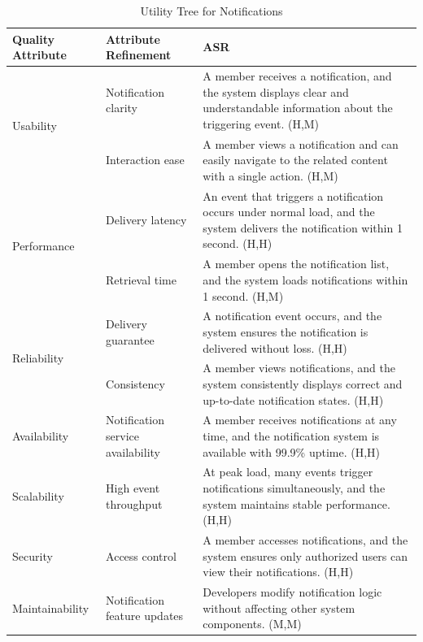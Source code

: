 \documentclass{article}
\begin{document}
\begin{table}[H]
\centering
\caption{Utility Tree for Notifications}
\begin{tabular}{|p{3cm}|p{4cm}|p{7cm}|}
\hline
\textbf{Quality Attribute} & \textbf{Attribute Refinement} & \textbf{ASR} \\
\hline

\multirow{2}{*}{Usability}
& Notification clarity
& A member receives a notification, and the system displays clear and understandable information about the triggering event. (H,M) \\
\cline{2-3}
& Interaction ease
& A member views a notification and can easily navigate to the related content with a single action. (H,M) \\
\hline

\multirow{2}{*}{Performance}
& Delivery latency
& An event that triggers a notification occurs under normal load, and the system delivers the notification within 1 second. (H,H) \\
\cline{2-3}
& Retrieval time
& A member opens the notification list, and the system loads notifications within 1 second. (H,M) \\
\hline

\multirow{2}{*}{Reliability}
& Delivery guarantee
& A notification event occurs, and the system ensures the notification is delivered without loss. (H,H) \\
\cline{2-3}
& Consistency
& A member views notifications, and the system consistently displays correct and up-to-date notification states. (H,H) \\
\hline

Availability
& Notification service availability
& A member receives notifications at any time, and the notification system is available with 99.9\% uptime. (H,H) \\
\hline

Scalability
& High event throughput
& At peak load, many events trigger notifications simultaneously, and the system maintains stable performance. (H,H) \\
\hline

Security
& Access control
& A member accesses notifications, and the system ensures only authorized users can view their notifications. (H,H) \\
\hline

Maintainability
& Notification feature updates
& Developers modify notification logic without affecting other system components. (M,M) \\
\hline


\end{tabular}
\end{table}
\end{document}
